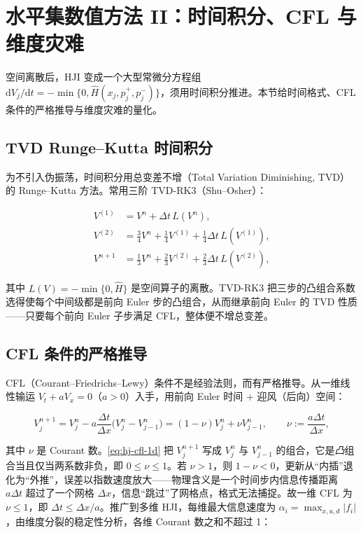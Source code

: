 \section{水平集数值方法 II：时间积分、CFL 与维度灾难}
\label{sec:hj-cfl}

空间离散后，HJI 变成一个大型常微分方程组 $\mathrm dV_j/\mathrm dt=-\min\{0,\hat H(x_j,p_j^+,p_j^-)\}$，须用时间积分推进。本节给时间格式、CFL 条件的严格推导与维度灾难的量化。

\subsection{TVD Runge--Kutta 时间积分}
\label{sec:hj-tvdrk}

为不引入伪振荡，时间积分用总变差不增（Total Variation Diminishing, TVD）的 Runge--Kutta 方法。常用三阶 TVD-RK3（Shu--Osher）：

\begin{equation}
\begin{aligned}
  V^{(1)}&=V^{n}+\Delta t\,L(V^{n}),\\
  V^{(2)}&=\tfrac{3}{4}V^{n}+\tfrac{1}{4}V^{(1)}+\tfrac{1}{4}\Delta t\,L(V^{(1)}),\\
  V^{n+1}&=\tfrac{1}{3}V^{n}+\tfrac{2}{3}V^{(2)}+\tfrac{2}{3}\Delta t\,L(V^{(2)}),
\end{aligned}
\label{eq:hj-tvdrk3}
\end{equation}

其中 $L(V)=-\min\{0,\hat H\}$ 是空间算子的离散。TVD-RK3 把三步的凸组合系数选得使每个中间级都是前向 Euler 步的凸组合，从而继承前向 Euler 的 TVD 性质——只要每个前向 Euler 子步满足 CFL，整体便不增总变差。

\subsection{CFL 条件的严格推导}
\label{sec:hj-cfl-derive}

CFL（Courant--Friedrichs--Lewy）条件不是经验法则，而有严格推导。从一维线性输运 $V_t+aV_x=0$（$a>0$）入手，用前向 Euler 时间 + 迎风（后向）空间：

\begin{equation}
  V_j^{n+1}=V_j^{n}-a\frac{\Delta t}{\Delta x}\big(V_j^{n}-V_{j-1}^{n}\big)=(1-\nu)V_j^{n}+\nu V_{j-1}^{n},\qquad \nu:=\frac{a\Delta t}{\Delta x},
  \label{eq:hj-cfl-1d}
\end{equation}

其中 $\nu$ 是 Courant 数。\cref{eq:hj-cfl-1d} 把 $V_j^{n+1}$ 写成 $V_j^n$ 与 $V_{j-1}^n$ 的组合，它是\emph{凸}组合当且仅当两系数非负，即 $0\le\nu\le1$。若 $\nu>1$，则 $1-\nu<0$，更新从“内插”退化为“外推”，误差以指数速度放大——物理含义是一个时间步内信息传播距离 $a\Delta t$ 超过了一个网格 $\Delta x$，信息“跳过”了网格点，格式无法捕捉。故一维 CFL 为 $\nu\le1$，即 $\Delta t\le\Delta x/a$。推广到多维 HJI，每维最大信息速度为 $\alpha_i=\max_{x,u,d}|f_i|$，由维度分裂的稳定性分析，各维 Courant 数之和不超过 1：


